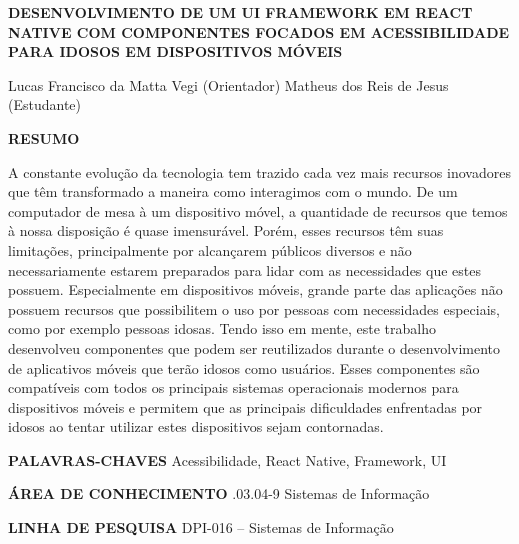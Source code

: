 \documentclass[
	12pt,				    %
	openright,			    %
	oneside,			    %
	a4paper,			    %
    sumario=tradicional,    %
	english,			    %
	brazil,				    %
	]{abntex2}              %
\begin{document}
\begin{resumo}
	\noindent

	\MakeUppercase{\textbf{Desenvolvimento de um UI Framework em React Native com componentes focados em acessibilidade para idosos em dispositivos móveis}}

	\vspace{\onelineskip}
	Lucas Francisco da Matta Vegi (Orientador) \newline
	Matheus dos Reis de Jesus (Estudante)
	\vspace{\onelineskip}

	\MakeUppercase{\textbf{Resumo}}

	A constante evolução da tecnologia tem trazido cada vez mais recursos inovadores que têm transformado a maneira como interagimos com o mundo. De um computador de mesa à um dispositivo móvel, a quantidade de recursos que temos à nossa disposição é quase imensurável. Porém, esses recursos têm suas limitações, principalmente por alcançarem públicos diversos e não necessariamente estarem preparados para lidar com as necessidades que estes possuem. Especialmente em dispositivos móveis, grande parte das aplicações não possuem recursos que possibilitem o uso por pessoas com necessidades especiais, como por exemplo pessoas idosas. Tendo isso em mente, este trabalho desenvolveu componentes que podem ser reutilizados durante o desenvolvimento de aplicativos móveis que terão idosos como usuários. Esses componentes são compatíveis com todos os principais sistemas operacionais modernos para dispositivos móveis e permitem que as principais dificuldades enfrentadas por idosos ao tentar utilizar estes dispositivos sejam contornadas.

	\vspace{\onelineskip}

	\noindent
	\MakeUppercase{\textbf{Palavras-chaves}} \newline
	Acessibilidade, React Native, Framework, UI
	\vspace{\onelineskip}

	\noindent
	\MakeUppercase{\textbf{Área de Conhecimento}} .03.04-9 Sistemas de Informação
	\vspace{\onelineskip}

	\noindent
	\MakeUppercase{\textbf{Linha de Pesquisa}} \newline
	DPI-016 – Sistemas de Informação
\end{resumo}
\end{document}
